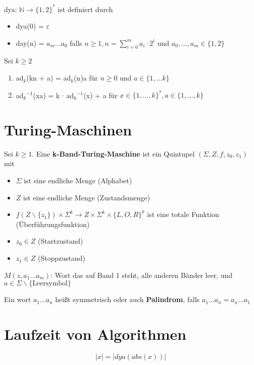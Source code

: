 \documentclass[14pt]{article}
\begin{document}
        \begin{definition}
            dya: $\mathbb{N} \rightarrow \{ 1, 2\}^*$ ist definiert durch
            \begin{itemize}
                \item dya(0) = $\varepsilon$
                \item day(n) = $a_m \dots a_0$ falls $n \geq 1, n = \sum_{i = 0}^m
                a_i \cdot 2^i$ und $a_0, \dots, a_m \in \{ 1, 2 \}$
            \end{itemize}
        \end{definition}
        
        \begin{eigenschaft}
            Sei $k \geq 2$
            \begin{enumerate}
                \item ad$_k$(kn + a) = ad$_k$(n)a für $n \geq 0$ und $a \in \{ 1, \dots k\}$
                \item ad$_k$$^{-1}$(xa) = k $\cdot$ ad$_k$$^{-1}$(x) + a
                für $x \in \{ 1, \dots, k\}^*, a \in \{ 1, \dots, k \}$
            \end{enumerate}
        \end{eigenschaft}

    \section{Turing-Maschinen}
        \begin{definition}
            Sei $k \geq 1$. Eine \textbf{k-Band-Turing-Maschine} ist 
            ein Quintupel $(\varSigma, Z, f, z_0, z_1)$ mit 
            \begin{itemize}
                \item $\varSigma$ ist eine endliche Menge (Alphabet)
                \item $Z$ ist eine endliche Menge (Zustandsmenge)
                \item $f(Z \backslash \{ z_1\}) \times \varSigma^k \rightarrow
                Z \times \varSigma^k \times \{ L, O, R \}^k$ ist eine totale Funktion
                (Überführungsfunktion)
                \item $z_0 \in Z$ (Startzustand)
                \item $z_1 \in Z$ (Stoppzustand)
            \end{itemize}
            $M(z, a_1 \dots a_m)$: Wort das auf Band 1 steht, alle anderen 
            Bänder leer, und $a \in \varSigma \backslash \{ \text{Leersymbol} \}$
        \end{definition}
        \begin{definition}[Palindrom]
            Ein wort $a_1 \dots a_n$ heißt symmetrisch oder auch 
            \textbf{Palindrom}, falls $a_1 \dots a_n = a_n \dots a_1$
        \end{definition}

    \section{Laufzeit von Algorithmen}
        \begin{definition}
            \[
                |x| = |dya(abs(x))| 
            \] 
        \end{definition}
\end{document}
